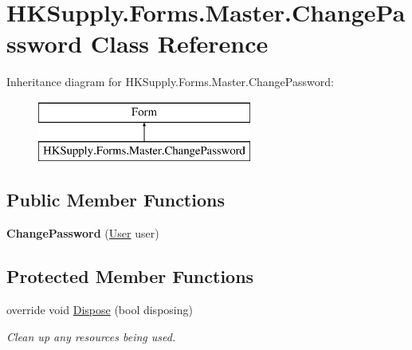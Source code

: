 \hypertarget{class_h_k_supply_1_1_forms_1_1_master_1_1_change_password}{}\section{H\+K\+Supply.\+Forms.\+Master.\+Change\+Password Class Reference}
\label{class_h_k_supply_1_1_forms_1_1_master_1_1_change_password}
Inheritance diagram for H\+K\+Supply.\+Forms.\+Master.\+Change\+Password\+:\begin{figure}[H]
\begin{center}
\leavevmode
\includegraphics[height=2.000000cm]{class_h_k_supply_1_1_forms_1_1_master_1_1_change_password}
\end{center}
\end{figure}
\subsection*{Public Member Functions}
\begin{DoxyCompactItemize}
\item 
\mbox{\label{class_h_k_supply_1_1_forms_1_1_master_1_1_change_password_aede98523b7abd2b8e57d2f7eb1f58154}} 
{\bfseries Change\+Password} (\mbox{\hyperlink{class_h_k_supply_1_1_models_1_1_user}{User}} user)
\end{DoxyCompactItemize}
\subsection*{Protected Member Functions}
\begin{DoxyCompactItemize}
\item 
override void \mbox{\hyperlink{class_h_k_supply_1_1_forms_1_1_master_1_1_change_password_a4370e4e0a208baadce764ed1081fb017}{Dispose}} (bool disposing)
\begin{DoxyCompactList}\small\item\em Clean up any resources being used. \end{DoxyCompactList}\end{DoxyCompactItemize}


